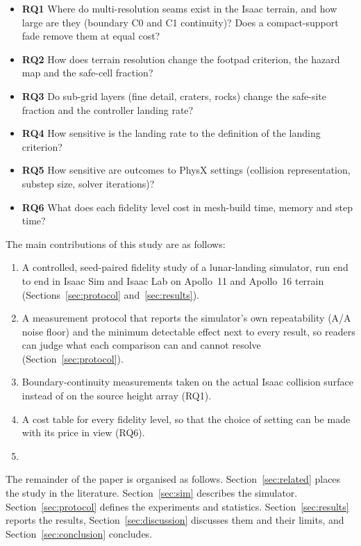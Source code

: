 \begin{itemize}
\item \textbf{RQ1} Where do multi-resolution seams exist in the Isaac terrain, and how large are they (boundary C0 and C1 continuity)? Does a compact-support fade remove them at equal cost?
\item \textbf{RQ2} How does terrain resolution change the footpad criterion, the hazard map and the safe-cell fraction?
\item \textbf{RQ3} Do sub-grid layers (fine detail, craters, rocks) change the safe-site fraction and the controller landing rate?
\item \textbf{RQ4} How sensitive is the landing rate to the definition of the landing criterion?
\item \textbf{RQ5} How sensitive are outcomes to PhysX settings (collision representation, substep size, solver iterations)?
\item \textbf{RQ6} What does each fidelity level cost in mesh-build time, memory and step time?
\end{itemize}

The main contributions of this study are as follows:

\begin{enumerate}
\item A controlled, seed-paired fidelity study of a lunar-landing simulator, run end to end in Isaac Sim and Isaac Lab on Apollo~11 and Apollo~16 terrain (Sections~\ref{sec:protocol} and~\ref{sec:results}).
\item A measurement protocol that reports the simulator's own repeatability (A/A noise floor) and the minimum detectable effect next to every result, so readers can judge what each comparison can and cannot resolve (Section~\ref{sec:protocol}).
\item Boundary-continuity measurements taken on the actual Isaac collision surface instead of on the source height array (RQ1).
\item A cost table for every fidelity level, so that the choice of setting can be made with its price in view (RQ6).
\item {}
\end{enumerate}

The remainder of the paper is organised as follows. Section~\ref{sec:related} places the study in the literature. Section~\ref{sec:sim} describes the simulator. Section~\ref{sec:protocol} defines the experiments and statistics. Section~\ref{sec:results} reports the results, Section~\ref{sec:discussion} discusses them and their limits, and Section~\ref{sec:conclusion} concludes.
